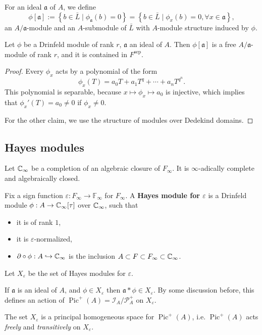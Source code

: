 \documentclass{article}
\newcommand{\F}{\mathbb{F}}
\newcommand{\sep}{\mathrm{sep}}
\DeclareMathOperator{\pic}{Pic}
\begin{document}
For an ideal $\mathfrak{a}$ of $A$,
we define \[\phi[\mathfrak{a}] := \left\{b\in\bar L\mid \phi_\mathfrak{a}(b) = 0\right\} = \left\{ b\in\bar L\mid \phi_x(b) = 0,\forall x\in\mathfrak{a} \right\},\]
an $A/\mathfrak{a}$-module and an $A$-submodule of $\bar L$ with $A$-module structure induced by $\phi$.

\begin{proposition}\label{torsion submodule of an ideal}
    Let $\phi$ be a Drinfeld module of rank $r$,
    $\mathfrak{a}$ an ideal of $A$.
    Then $\phi[\mathfrak{a}]$ is a free $A/\mathfrak{a}$-module of rank $r$,
    and it is contained in $F^\sep$.
\end{proposition}
\begin{proof}
    Every $\phi_x$ acts by a polynomial of the form\[\phi_x(T) = a_0T + a_1T^q + \cdots + a_nT^{q^n}.\]
    This polynomial is separable, because $x\mapsto \phi_x\mapsto a_0$ is injective, which implies that $\phi_x'(T) = a_0\ne 0$ if $\phi_x \ne 0$.

    For the other claim, we use the structure of modules over Dedekind domains.
\end{proof}



\subsection{Hayes modules}

Let $\mathbb{C}_\infty$ be a completion of an algebraic closure of $F_\infty$.
It is $\infty$-adically complete and algebraically closed.

Fix a sign function $\varepsilon : F_\infty\to\F_\infty$ for $F_\infty$.
A \textbf{Hayes module for $\varepsilon$}
is a Drinfeld module $\phi : A\to \mathbb{C}_\infty[\tau]$ over $\mathbb{C}_\infty$,
such that\begin{itemize}
\item it is of rank $1$,
\item it is $\varepsilon$-normalized,
\item $\partial\circ\phi : A\hookrightarrow\mathbb{C}_\infty$ is the inclusion $A\subset F\subset F_\infty\subset \mathbb{C}_\infty$.
\end{itemize}
Let $X_\varepsilon$ be the set of Hayes modules for $\varepsilon$.


If $\mathfrak{a}$ is an ideal of $A$, and $\phi\in X_\varepsilon$
then $\mathfrak{a}*\phi\in X_\varepsilon$.
By some discussion before,
this defines an action of $\pic^+(A) = \mathcal{I}_A/\mathcal{P}^+_A$
on $X_\varepsilon$.
\begin{proposition}\label{action of Pic+ on the set of Hayes modules}
    The set $X_\varepsilon$ is a principal homogeneous space for $\pic^+(A)$, i.e. $\pic^+(A)$ acts \textit{freely} and \textit{transitively} on $X_\varepsilon$.
\end{proposition}
\end{document}

